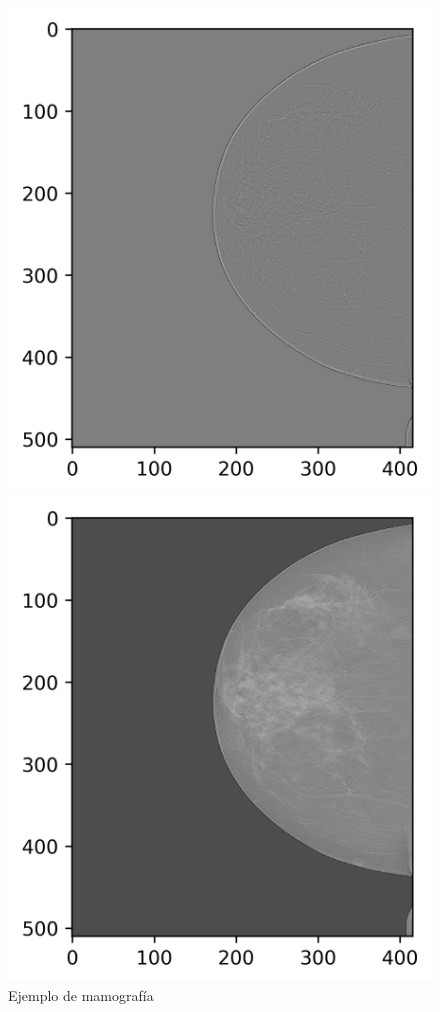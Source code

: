 \begin{figure}
\begin{multicols}{2}
    \end{multicols}
\begin{multicols}{2}
    \includegraphics[width=\linewidth]{Graphics/mm-sharp.png}\par
    \includegraphics[width=\linewidth]{Graphics/mm-fusion.png}\par
\end{multicols}
\caption{Ejemplo de mamografía } \label{fig:example-mm}
\end{figure}


